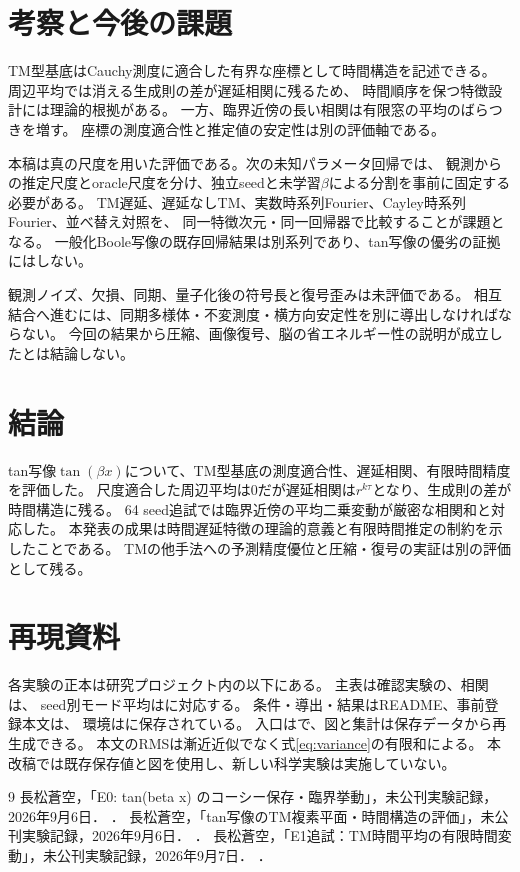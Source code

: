 \documentclass[a4paper,11pt]{jlreq}
\begin{document}
\section{考察と今後の課題}
TM型基底はCauchy測度に適合した有界な座標として時間構造を記述できる。
周辺平均では消える生成則の差が遅延相関に残るため、
時間順序を保つ特徴設計には理論的根拠がある。
一方、臨界近傍の長い相関は有限窓の平均のばらつきを増す。
座標の測度適合性と推定値の安定性は別の評価軸である。

本稿は真の尺度を用いた評価である。次の未知パラメータ回帰では、
観測からの推定尺度とoracle尺度を分け、独立seedと未学習$\beta$による分割を事前に固定する必要がある。
TM遅延、遅延なしTM、実数時系列Fourier、Cayley時系列Fourier、並べ替え対照を、
同一特徴次元・同一回帰器で比較することが課題となる。
一般化Boole写像の既存回帰結果は別系列であり、tan写像の優劣の証拠にはしない。

観測ノイズ、欠損、同期、量子化後の符号長と復号歪みは未評価である。
相互結合へ進むには、同期多様体・不変測度・横方向安定性を別に導出しなければならない。
今回の結果から圧縮、画像復号、脳の省エネルギー性の説明が成立したとは結論しない。

\section{結論}
tan写像$\tan(\beta x)$について、TM型基底の測度適合性、遅延相関、有限時間精度を評価した。
尺度適合した周辺平均は0だが遅延相関は$r^{k\tau}$となり、生成則の差が時間構造に残る。
64 seed追試では臨界近傍の平均二乗変動が厳密な相関和と対応した。
本発表の成果は時間遅延特徴の理論的意義と有限時間推定の制約を示したことである。
TMの他手法への予測精度優位と圧縮・復号の実証は別の評価として残る。

\appendix
\section{再現資料}
各実験の正本は研究プロジェクト内の以下にある。
主表は確認実験の、相関は、
seed別モード平均はに対応する。
条件・導出・結果はREADME、事前登録本文は、
環境はに保存されている。
入口はで、図と集計は保存データから再生成できる。
本文のRMSは漸近近似でなく式\eqref{eq:variance}の有限和による。
本改稿では既存保存値と図を使用し、新しい科学実験は実施していない。

\begin{thebibliography}{9}
 長松蒼空，「E0: tan(beta x) のコーシー保存・臨界挙動」，未公刊実験記録，2026年9月6日．
．
 長松蒼空，「tan写像のTM複素平面・時間構造の評価」，未公刊実験記録，2026年9月6日．
．
 長松蒼空，「E1追試：TM時間平均の有限時間変動」，未公刊実験記録，2026年9月7日．
．
\end{thebibliography}
\end{document}
